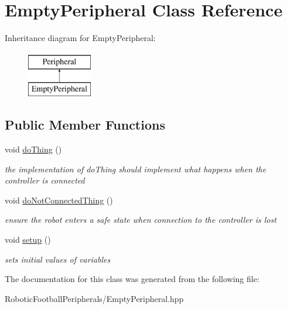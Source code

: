 \hypertarget{class_empty_peripheral}{}\section{Empty\+Peripheral Class Reference}
\label{class_empty_peripheral}
Inheritance diagram for Empty\+Peripheral\+:\begin{figure}[H]
\begin{center}
\leavevmode
\includegraphics[height=2.000000cm]{class_empty_peripheral}
\end{center}
\end{figure}
\subsection*{Public Member Functions}
\begin{DoxyCompactItemize}
\item 
\mbox{\label{class_empty_peripheral_a563da11bcb1e8b63a6472af037d1b38c}} 
void \mbox{\hyperlink{class_empty_peripheral_a563da11bcb1e8b63a6472af037d1b38c}{do\+Thing}} ()
\begin{DoxyCompactList}\small\item\em the implementation of do\+Thing should implement what happens when the controller is connected \end{DoxyCompactList}\item 
\mbox{\label{class_empty_peripheral_a9a3476c5016dd2865fcad3bd76010069}} 
void \mbox{\hyperlink{class_empty_peripheral_a9a3476c5016dd2865fcad3bd76010069}{do\+Not\+Connected\+Thing}} ()
\begin{DoxyCompactList}\small\item\em ensure the robot enters a safe state when connection to the controller is lost \end{DoxyCompactList}\item 
\mbox{\label{class_empty_peripheral_ae10feab672960c5eb6905fa2ff6f340b}} 
void \mbox{\hyperlink{class_empty_peripheral_ae10feab672960c5eb6905fa2ff6f340b}{setup}} ()
\begin{DoxyCompactList}\small\item\em sets initial values of variables \end{DoxyCompactList}\end{DoxyCompactItemize}


The documentation for this class was generated from the following file\+:\begin{DoxyCompactItemize}
\item 
Robotic\+Football\+Peripherals/Empty\+Peripheral.\+hpp\end{DoxyCompactItemize}
